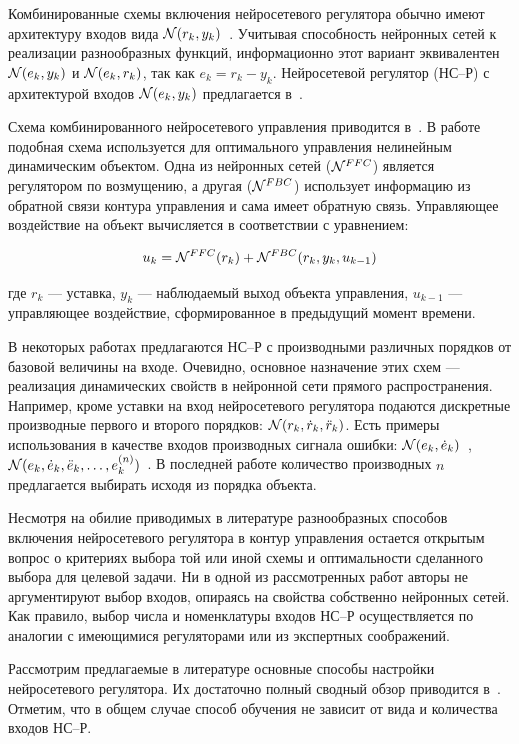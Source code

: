 Комбинированные схемы включения нейросетевого регулятора обычно имеют
архитектуру входов вида
$\mathcal{N}(r_k,y_k)$~\cite{narpart92}\cite{trc95}\cite{samtar96}.  Учитывая
способность нейронных сетей к реализации разнообразных функций,
информационно этот вариант эквивалентен $\mathcal{N}(e_k,y_k)$ и
$\mathcal{N}(e_k,r_k)$, так как $e_k=r_k-y_k$.  Нейросетевой регулятор (НС--Р)
с архитектурой входов $\mathcal{N}(e_k,y_k)$ предлагается в~\cite{narmuk96}.

Схема комбинированного нейросетевого управления приводится
в~\cite{sigom00}.  В работе~\cite{park96} подобная схема используется
для оптимального управления нелинейным динамическим объектом.  Одна из
нейронных сетей ($\mathcal{N}^{FFC}$) является регулятором по возмущению, а
другая ($\mathcal{N}^{FBC}$) использует информацию из обратной связи контура
управления и сама имеет обратную связь.  Управляющее воздействие на
объект вычисляется в соответствии с уравнением:

$$
u_{k}=\mathcal{N}^{FFC}(r_k)+\mathcal{N}^{FBC}(r_k, y_k, u_{k-1})
$$

\noindent
где $r_k$ --- уставка, $y_k$ --- наблюдаемый выход объекта управления,
$u_{k-1}$ --- управляющее воздействие, сформированное в предыдущий
момент времени.

В некоторых работах предлагаются НС--Р с производными различных
порядков от базовой величины на входе.  Очевидно, основное назначение
этих схем --- реализация динамических свойств в нейронной сети прямого
распространения.  Например, кроме уставки на вход нейросетевого
регулятора подаются дискретные производные первого и второго порядков:
$\mathcal{N}(r_k,\dot{r}_k,\ddot{r}_k)$.  Есть примеры использования в
качестве входов производных сигнала ошибки:
$\mathcal{N}(e_k,\dot{e}_k)$~\cite{wailinlin00}\cite{linwaihong01},
$\mathcal{N}(e_k,\dot{e}_k,\ddot{e}_k,\ldots,{e}^{(n)}_k)$~\cite{eremin95}.  В
последней работе количество производных $n$ предлагается выбирать
исходя из порядка объекта.

Несмотря на обилие приводимых в литературе разнообразных способов
включения нейросетевого регулятора в контур управления остается
открытым вопрос о критериях выбора той или иной схемы и оптимальности
сделанного выбора для целевой задачи.  Ни в одной из рассмотренных
работ авторы не аргументируют выбор входов, опираясь на свойства
собственно нейронных сетей.  Как правило, выбор числа и номенклатуры
входов НС--Р осуществляется по аналогии с имеющимися регуляторами или
из экспертных соображений.

Рассмотрим предлагаемые в литературе основные способы настройки
нейросетевого регулятора.  Их достаточно полный сводный обзор
приводится в~\cite{sigom00}.  Отметим, что в общем случае способ
обучения не зависит от вида и количества входов НС--Р.

